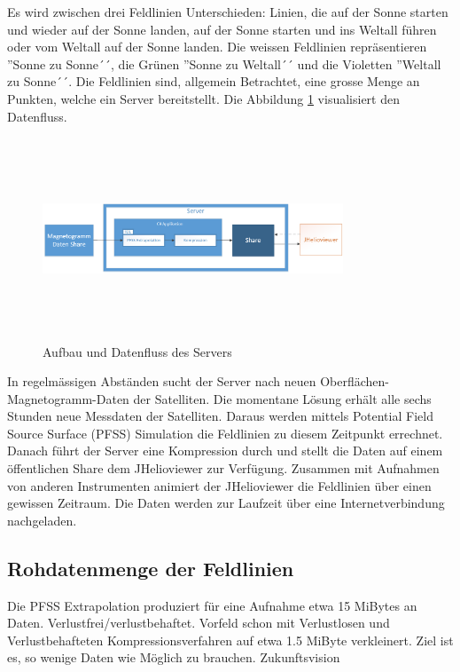 Es wird zwischen drei Feldlinien Unterschieden: Linien, die auf der Sonne starten und wieder auf der Sonne landen, auf der Sonne starten und ins Weltall führen oder vom Weltall auf der Sonne landen. Die weissen Feldlinien repräsentieren ''Sonne zu Sonne´´, die Grünen ''Sonne zu Weltall´´ und die Violetten ''Weltall zu Sonne´´. Die Feldlinien sind, allgemein Betrachtet, eine grosse Menge an Punkten, welche ein Server bereitstellt. Die Abbildung \ref{einleitung::aufbau} visualisiert den Datenfluss.
\begin{figure}[!htbp]
\center
	\includegraphics[width=0.8\textwidth,height=6cm,keepaspectratio]{./pictures/einleitung/server.png}
	\caption{Aufbau und Datenfluss des Servers}
	\label{einleitung::aufbau}
\end{figure}
In regelmässigen Abständen sucht der Server nach neuen Oberflächen-Magnetogramm-Daten der Satelliten. Die momentane Lösung erhält alle sechs Stunden neue Messdaten der Satelliten. Daraus werden mittels Potential Field Source Surface (PFSS) Simulation die Feldlinien zu diesem Zeitpunkt errechnet. Danach führt der Server eine Kompression durch und stellt die Daten auf einem öffentlichen Share dem JHelioviewer zur Verfügung. Zusammen mit Aufnahmen von anderen Instrumenten animiert der JHelioviewer die Feldlinien über einen gewissen Zeitraum. Die Daten werden zur Laufzeit über eine Internetverbindung nachgeladen.

\subsection{Rohdatenmenge der Feldlinien}
Die PFSS Extrapolation produziert für eine Aufnahme etwa 15 MiBytes an Daten.
Verlustfrei/verlustbehaftet.
Vorfeld schon mit Verlustlosen und Verlustbehafteten Kompressionsverfahren auf etwa 1.5 MiByte verkleinert.
Ziel ist es, so wenige Daten wie Möglich zu brauchen. Zukunftsvision




 